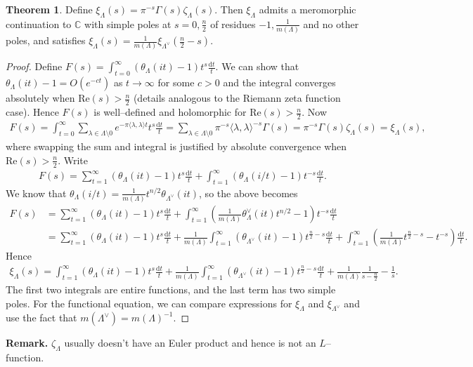 \documentclass{article}
\theoremstyle{definition}
\newtheorem{theorem}{Theorem}[section]
\begin{document}
\begin{theorem}
    Define $\xi_\Lambda(s) = \pi^{-s}\Gamma(s)\zeta_{\Lambda}(s)$. Then $\xi_{\Lambda}$ admits a meromorphic continuation to $\mathbb{C}$ with simple poles at $s=0, \frac{n}{2}$ of residues $-1, \frac{1}{m(\Lambda)}$ and no other poles, and satisfies $\xi_\Lambda(s) = \frac{1}{m(\Lambda)}\xi_{\Lambda^\vee}\left(\frac{n}{2}-s \right)$.
\end{theorem}
\begin{proof}
    Define $F(s) = \int_{t=0}^{\infty} (\theta_{\Lambda}(it)-1)t^s \frac{\mathrm{d}t}{t}$. We can show that $\theta_{\Lambda}(it)-1 = O(e^{-ct})$ as $t \to \infty$ for some $c>0$ and the integral converges absolutely when $\text{Re}(s)>\frac{n}{2}$ (details analogous to the Riemann zeta function case). Hence $F(s)$ is well--defined and holomorphic for $\text{Re}(s)>\frac{n}{2}$. Now 
    \begin{align*}
        F(s) = \int_{t=0}^{\infty} \sum_{\lambda \in \Lambda \setminus 0}^{} e^{-\pi \langle \lambda, \lambda \rangle t}t^s \frac{\mathrm{d}t}{t} = \sum_{\lambda \in \Lambda \setminus  0}^{} \pi^{-s} \langle \lambda, \lambda \rangle^{-s} \Gamma(s) = \pi^{-s}\Gamma(s)\zeta_{\Lambda}(s) = \xi_{\Lambda}(s),
    \end{align*}
    where swapping the sum and integral is justified by absolute convergence when $\text{Re}(s)>\frac{n}{2}$. Write 
    \begin{align*}
        F(s) = \sum_{t=1}^{\infty} (\theta_{\Lambda}(it)-1)t^s\frac{\mathrm{d}t}{t} + \int_{t=1}^{\infty} \left(\theta_\Lambda(i/t)-1\right)t^{-s}\frac{\mathrm{d}t}{t}.
    \end{align*}
    We know that $\theta_{\Lambda}(i/t) = \frac{1}{m(\Lambda)} t^{n/2} \theta_{\Lambda^{\vee}}(it)$, so the above becomes 
    \begin{align*}
        F(s) &= \sum_{t=1}^{\infty} (\theta_{\Lambda}(it)-1)t^s\frac{\mathrm{d}t}{t} + \int_{t=1}^{\infty} \left(\frac{1}{m(\Lambda)} \theta_\Lambda^{\vee}(it)t^{n/2}-1 \right) t^{-s} \frac{\mathrm{d}t}{t} \\
        &= \sum_{t=1}^{\infty} (\theta_{\Lambda}(it)-1)t^s\frac{\mathrm{d}t}{t} + \frac{1}{m(\Lambda)}\int_{t=1}^{\infty} (\theta_{\Lambda^\vee}(it)-1)t^{\frac{n}{2}-s} \frac{\mathrm{d}t}{t} + \int_{t=1}^{\infty} \left(\frac{1}{m(\Lambda)} t^{\frac{n}{2}-s} - t^{-s}\right) \frac{\mathrm{d}t}{t}.
    \end{align*}
    Hence 
    \begin{align*}
        \xi_{\Lambda}(s) = \int_{t=1}^{\infty} (\theta_{\Lambda}(it) -1)t^s \frac{\mathrm{d}t}{t} + \frac{1}{m(\Lambda)} \int_{t=1}^{\infty} (\theta_{\Lambda^\vee}(it)-1)t^{\frac{n}{2}-s} \frac{\mathrm{d}t}{t} + \frac{1}{m(\Lambda)} \frac{1}{s-\frac{n}{2}} - \frac{1}{s}.
    \end{align*}
    The first two integrals are entire functions, and the last term has two simple poles. For the functional equation, we can compare expressions for $\xi_{\Lambda}$ and $\xi_{\Lambda^\vee}$ and use the fact that $m(\Lambda^\vee) = m(\Lambda)^{-1}$.
\end{proof}
\textbf{Remark.} $\zeta_{\Lambda}$ usually doesn't have an Euler product and hence is not an $L$--function.
\end{document}
